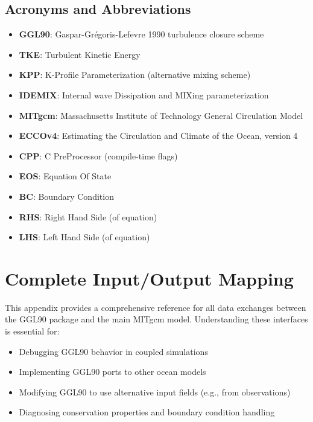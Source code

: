 \documentclass[12pt,letterpaper]{article}
\begin{document}
\subsection*{Acronyms and Abbreviations}

\begin{itemize}
\item \textbf{GGL90}: Gaspar-Grégoris-Lefevre 1990 turbulence closure scheme
\item \textbf{TKE}: Turbulent Kinetic Energy
\item \textbf{KPP}: K-Profile Parameterization (alternative mixing scheme)
\item \textbf{IDEMIX}: Internal wave Dissipation and MIXing parameterization
\item \textbf{MITgcm}: Massachusetts Institute of Technology General Circulation Model
\item \textbf{ECCOv4}: Estimating the Circulation and Climate of the Ocean, version 4
\item \textbf{CPP}: C PreProcessor (compile-time flags)
\item \textbf{EOS}: Equation Of State
\item \textbf{BC}: Boundary Condition
\item \textbf{RHS}: Right Hand Side (of equation)
\item \textbf{LHS}: Left Hand Side (of equation)
\end{itemize}

\section{Complete Input/Output Mapping}
\label{app:io_mapping}

This appendix provides a comprehensive reference for all data exchanges between the GGL90 package and the main MITgcm model. Understanding these interfaces is essential for:
\begin{itemize}
\item Debugging GGL90 behavior in coupled simulations
\item Implementing GGL90 ports to other ocean models
\item Modifying GGL90 to use alternative input fields (e.g., from observations)
\item Diagnosing conservation properties and boundary condition handling
\end{itemize}
\end{document}
